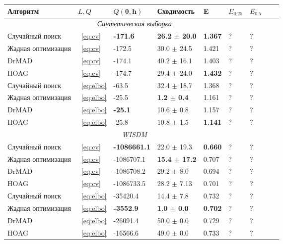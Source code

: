 \begin{table}
\small
\begin{tabularx}{\textwidth}{ |X|X|X|X|X|X|X|X|X|}

\hline
\textbf{Алгоритм} & $L, Q$  & $Q(\boldsymbol{\theta}, \mathbf{h})$ & Сходимость & E & $E_{0.25}$ & $E_{0.5}$\\ 
\hline
\multicolumn{7}{|c|}{\textit{Синтетическая выборка}}  \\
\hline
Случайный поиск & ~\eqref{eq:cv} & \bf -171.6  &\bf 26.2 $\pm$ 20.0  & \bf 1.367 & ? & ? \\
\hline
Жадная оптимизация & ~\eqref{eq:cv} & -172.5 & 30.0 $\pm$ 24.5 & 1.421 & ? & ? \\
\hline
DrMAD & ~\eqref{eq:cv} & -174.1 & 40.2 $\pm$ 16.1 &  1.403 & ? & ?\\
\hline
HOAG & ~\eqref{eq:cv} &-174.7 & 29.4 $\pm$ 24.0 &   \bf 1.432  & ? & ?\\
\hline
Случайный поиск & ~\eqref{eq:elbo} & -63.5  & 32.4 $\pm$ 18.7  & 1.368 & ? & ?  \\
\hline
Жадная оптимизация & ~\eqref{eq:elbo} & -25.5 & \bf 1.2 $\pm$ 0.4 & 1.161 & ? & ?\\
\hline
DrMAD & ~\eqref{eq:elbo} & \bf -25.1 &  10.6 $\pm$ 0.8 &  1.157 & ? & ?\\
\hline
HOAG & ~\eqref{eq:elbo} &-25.8 & 10.8 $\pm$ 1.5&   \bf 1.141  & ? & ?\\
\hline


\multicolumn{7}{|c|}{\textit{WISDM}}  \\
\hline
Случайный поиск & ~\eqref{eq:cv} & \bf -1086661.1  & 22.0 $\pm$ 19.3  & \bf 0.660 & ? & ? \\
\hline
Жадная оптимизация & ~\eqref{eq:cv} & -1086707.1 & \bf 15.4 $\pm$ 17.2 & 0.707 & ? & ? \\
\hline
DrMAD & ~\eqref{eq:cv} & -1086708.2 & 29.2 $\pm$ 8.0 &  0.694 & ? & ? \\
\hline
HOAG & ~\eqref{eq:cv} & -1086733.5 & 28.2 $\pm$ 7.13&   0.701 & ? & ? \\
\hline
Случайный поиск & ~\eqref{eq:elbo} & -35420.4 &   14.4 $\pm$ 7.8  &   0.732 & ? & ? \\
\hline
Жадная оптимизация & ~\eqref{eq:elbo} & \bf -3552.9 &\bf 1.0 $\pm$ 0.0  &   \bf 0.702 & ? & ? \\
\hline
DrMAD & ~\eqref{eq:elbo} & -26091.4 &   50.0 $\pm$ 0.0  & 0.729 & ? & ? \\
\hline
HOAG & ~\eqref{eq:elbo} &  -16566.6 & 49.0 $\pm$ 0.0  &  0.733 & ? & ? \\
\hline




\end{tabularx}
\end{table}
